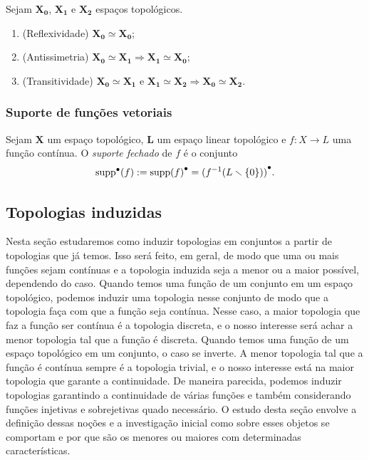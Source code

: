 \begin{exercise}
Sejam $\bm{X_0}$, $\bm{X_1}$ e $\bm{X_2}$ espaços topológicos.
		\begin{enumerate}
		\item (Reflexividade) $\bm{X_0} \simeq \bm{X_0}$;
		\item (Antissimetria) $\bm{X_0} \simeq \bm{X_1} \Rightarrow \bm{X_1} \simeq \bm{X_0}$;
		\item (Transitividade) $\bm{X_0} \simeq \bm{X_1} \text{\ \ e\ \ } \bm{X_1} \simeq \bm{X_2} \Rightarrow \bm{X_0} \simeq \bm{X_2}$.
		\end{enumerate}
\end{exercise}

\subsubsection{Suporte de funções vetoriais}

\begin{definition}
Sejam $\bm X$ um espaço topológico, $\bm L$ um espaço linear topológico e $f\colon X \to L$ uma função contínua. O \emph{suporte fechado} de $f$ é o conjunto
	\begin{equation*}
	\operatorname{supp}^{\bullet}(f) := {\operatorname{supp}(f)}^\bullet = {(f^{-1}(L \smallsetminus \{0\}))}^\bullet.
	\end{equation*}
\end{definition}

\subsection{Topologias induzidas}

Nesta seção estudaremos como induzir topologias em conjuntos a partir de topologias que já temos. Isso será feito, em geral, de modo que uma ou mais funções sejam contínuas e a topologia induzida seja a menor ou a maior possível, dependendo do caso. Quando temos uma função de um conjunto em um espaço topológico, podemos induzir uma topologia nesse conjunto de modo que a topologia faça com  que a função seja contínua. Nesse caso, a maior topologia que faz a função ser contínua é a topologia discreta, e o nosso interesse será achar a menor topologia tal que a função é discreta. Quando temos uma função de um espaço topológico em um conjunto, o caso se inverte. A menor topologia tal que a função é contínua sempre é a topologia trivial, e o nosso interesse está na maior topologia que garante a continuidade. De maneira parecida, podemos induzir topologias garantindo a continuidade de várias funções e também considerando funções injetivas e sobrejetivas quado necessário. O estudo desta seção envolve a definição dessas noções e a investigação inicial como sobre esses objetos se comportam e por que são os menores ou maiores com determinadas características.

